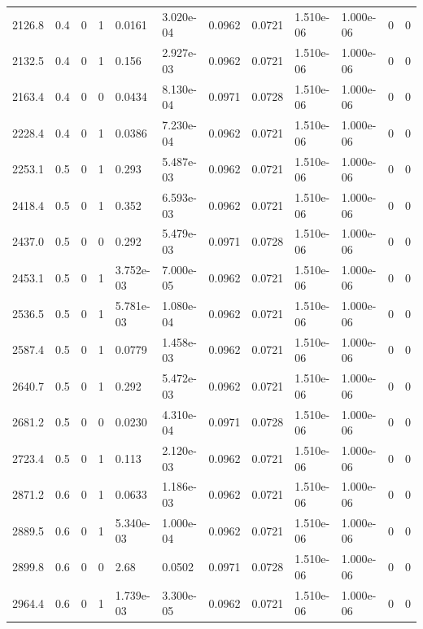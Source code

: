 \documentclass[preview]{standalone}
\begin{document}
{{{\begin{tabular}{L{1.2cm}C{1.2cm} C{0.3cm}C{0.5cm} C{1.4cm}C{1.4cm} C{1.4cm}C{1.4cm} C{1.6cm}C{1.6cm} C{1.6cm}C{1.6cm}}
  2126.8  &   0.4  & 0     &  1 &  0.0161  & 3.020e-04  &  0.0962&   0.0721& 1.510e-06 & 1.000e-06   &  0 & 0  \\ 
  2132.5  &   0.4  & 0     &  1 &  0.156  & 2.927e-03  &  0.0962&   0.0721& 1.510e-06 & 1.000e-06   &  0 & 0  \\ 
  2163.4  &   0.4  & 0     &  0 &  0.0434  & 8.130e-04  &  0.0971&   0.0728& 1.510e-06 & 1.000e-06   &  0 & 0  \\ 
  2228.4  &   0.4  & 0     &  1 &  0.0386  & 7.230e-04  &  0.0962&   0.0721& 1.510e-06 & 1.000e-06   &  0 & 0  \\ 
  2253.1  &   0.5  & 0     &  1 &  0.293  & 5.487e-03  &  0.0962&   0.0721& 1.510e-06 & 1.000e-06   &  0 & 0  \\ 
  2418.4  &   0.5  & 0     &  1 &  0.352  & 6.593e-03  &  0.0962&   0.0721& 1.510e-06 & 1.000e-06   &  0 & 0  \\ 
  2437.0  &   0.5  & 0     &  0 &  0.292  & 5.479e-03  &  0.0971&   0.0728& 1.510e-06 & 1.000e-06   &  0 & 0  \\ 
  2453.1  &   0.5  & 0     &  1 &  3.752e-03  & 7.000e-05  &  0.0962&   0.0721& 1.510e-06 & 1.000e-06   &  0 & 0  \\ 
  2536.5  &   0.5  & 0     &  1 &  5.781e-03  & 1.080e-04  &  0.0962&   0.0721& 1.510e-06 & 1.000e-06   &  0 & 0  \\ 
  2587.4  &   0.5  & 0     &  1 &  0.0779  & 1.458e-03  &  0.0962&   0.0721& 1.510e-06 & 1.000e-06   &  0 & 0  \\ 
  2640.7  &   0.5  & 0     &  1 &  0.292  & 5.472e-03  &  0.0962&   0.0721& 1.510e-06 & 1.000e-06   &  0 & 0  \\ 
  2681.2  &   0.5  & 0     &  0 &  0.0230  & 4.310e-04  &  0.0971&   0.0728& 1.510e-06 & 1.000e-06   &  0 & 0  \\ 
  2723.4  &   0.5  & 0     &  1 &  0.113  & 2.120e-03  &  0.0962&   0.0721& 1.510e-06 & 1.000e-06   &  0 & 0  \\ 
  2871.2  &   0.6  & 0     &  1 &  0.0633  & 1.186e-03  &  0.0962&   0.0721& 1.510e-06 & 1.000e-06   &  0 & 0  \\ 
  2889.5  &   0.6  & 0     &  1 &  5.340e-03  & 1.000e-04  &  0.0962&   0.0721& 1.510e-06 & 1.000e-06   &  0 & 0  \\ 
  2899.8  &   0.6  & 0     &  0 &  2.68  & 0.0502  &  0.0971&   0.0728& 1.510e-06 & 1.000e-06   &  0 & 0  \\ 
  2964.4  &   0.6  & 0     &  1 &  1.739e-03  & 3.300e-05  &  0.0962&   0.0721& 1.510e-06 & 1.000e-06   &  0 & 0  \\ 

\end{tabular}}}}
\end{document}
